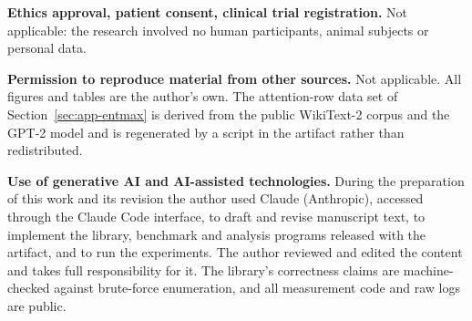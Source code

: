 \documentclass[preprint,12pt]{elsarticle}
\begin{document}
\medskip\noindent\textbf{Ethics approval, patient consent, clinical trial
registration.} Not applicable: the research involved no human participants, animal
subjects or personal data.

\medskip\noindent\textbf{Permission to reproduce material from other sources.} Not
applicable. All figures and tables are the author's own. The attention-row data set
of Section~\ref{sec:app-entmax} is derived from the public WikiText-2 corpus and
the GPT-2 model and is regenerated by a script in the artifact rather than
redistributed.

\medskip\noindent\textbf{Use of generative AI and AI-assisted technologies.} During
the preparation of this work and its revision the author used Claude (Anthropic),
accessed through the Claude Code interface, to draft and revise manuscript text, to
implement the library, benchmark and analysis programs released with the artifact,
and to run the experiments. The author reviewed and edited the content and takes
full responsibility for it. The library's correctness claims are machine-checked
against brute-force enumeration, and all measurement code and raw logs are public.



\end{document}
